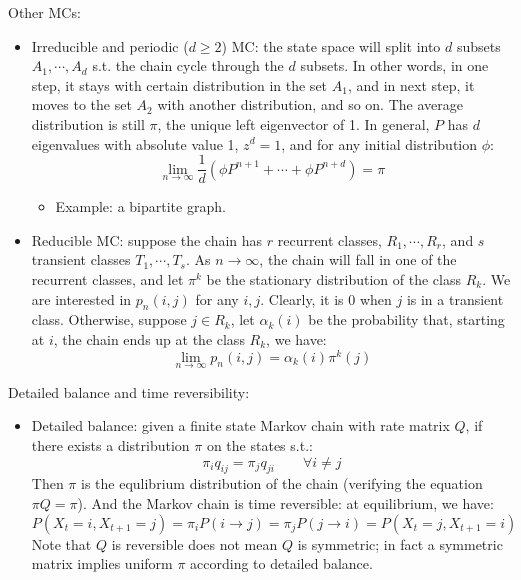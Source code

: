 \documentclass{report}
\begin{document}
\begin{enumerate}
\begin{itemize}
\end{itemize}

Other MCs: 
\begin{itemize}
\item Irreducible and periodic ($d \geq 2$) MC: the state space will split into $d$ subsets $A_1, \cdots, A_d$ s.t. the chain cycle through the $d$ subsets. In other words, in one step, it stays with certain distribution in the set $A_1$, and in next step, it moves to the set $A_2$ with another distribution, and so on. The average distribution is still $\pi$, the unique left eigenvector of 1. In general, $P$ has $d$ eigenvalues with absolute value 1, $z^d = 1$, and for any initial distribution $\phi$:
\begin{equation}
\lim_{n \to \infty} \frac{1}{d} \left( \phi P^{n+1} + \cdots +\phi P^{n+d} \right) = \pi	
\end{equation}
\begin{itemize}
	\item Example: a bipartite graph. 
\end{itemize}

\item Reducible MC: suppose the chain has $r$ recurrent classes, $R_1, \cdots, R_r$, and $s$ transient classes $T_1, \cdots, T_s$. As $n \to \infty$, the chain will fall in one of the recurrent classes, and let $\pi^k$ be the stationary distribution of the class $R_k$. We are interested in $p_n(i,j)$ for any $i,j$. Clearly, it is 0 when $j$ is in a transient class. Otherwise, suppose $j \in R_k$, let $\alpha_k(i)$ be the probability that, starting at $i$, the chain ends up at the class $R_k$, we have: 
\begin{equation}
\lim_{n \to \infty}	p_n(i,j) = \alpha_k(i) \pi^k(j)
\end{equation}

 
\end{itemize}

Detailed balance and time reversibility: 
\begin{itemize}
\item Detailed balance: given a finite state Markov chain with rate matrix $Q$, if there exists a distribution $\pi$ on the states s.t.: 
\begin{equation}
\pi_i q_{ij} = \pi_j q_{ji}	\qquad \forall i \neq j
\end{equation}
Then $\pi$ is the equlibrium distribution of the chain (verifying the equation $\pi Q = \pi$). And the Markov chain is time reversible: at equilibrium, we have: 
\begin{equation}
P(X_t = i, X_{t+1} = j) = \pi_i P(i \rightarrow j) = \pi_j P(j \rightarrow i) = P(X_t = j, X_{t+1} = i)	
\end{equation}
Note that $Q$ is reversible does not mean $Q$ is symmetric; in fact a symmetric matrix implies uniform $\pi$ according to detailed balance. 


\end{itemize}
\end{enumerate}
\end{document}
